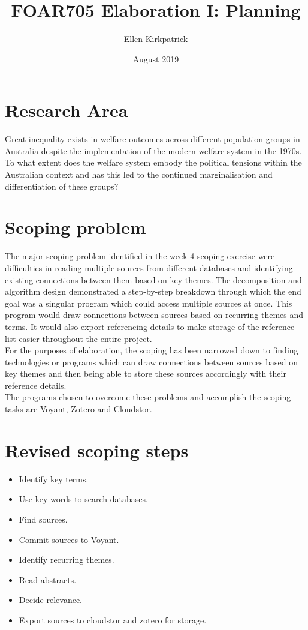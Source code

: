 \documentclass{article}
\title{FOAR705 Elaboration I: Planning}
\author{Ellen Kirkpatrick }
\date{August 2019}
\begin{document}
\maketitle

\section{Research Area}
Great inequality exists in welfare outcomes across different population groups in Australia despite the implementation of the modern welfare system in the 1970s. To what extent does the welfare system embody the political tensions within the Australian context and has this led to the continued marginalisation and differentiation of these groups?

\section{Scoping problem}
The major scoping problem identified in the week 4 scoping exercise were difficulties in reading multiple sources from different databases and identifying existing connections between them based on key themes. The decomposition and algorithm design demonstrated a step-by-step breakdown through which the end goal was a singular program which could access multiple sources at once. This program would draw connections between sources based on recurring themes and terms. It would also export referencing details to make storage of the reference list easier throughout the entire project. \\
For the purposes of elaboration, the scoping has been narrowed down to finding technologies or programs which can draw connections between sources based on key themes and then being able to store these sources accordingly with their reference details. \\
The programs chosen to overcome these problems and accomplish the scoping tasks are Voyant, Zotero and Cloudstor. 

\section{Revised scoping steps}
\begin{itemize}
    \item Identify key terms.
    \item Use key words to search databases.
    \item Find sources.
    \item Commit sources to Voyant.
    \item Identify recurring themes.
    \item Read abstracts.
    \item Decide relevance.
    \item Export sources to cloudstor and zotero for storage.
    
\end{itemize}
\end{document}
